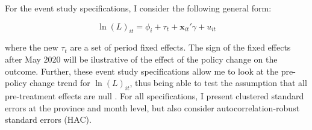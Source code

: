 \documentclass[11pt,a4paper]{article}\usepackage[]{graphicx}\usepackage[]{xcolor}
\begin{document}
For the event study specifications, I consider the following general form:

\begin{equation}
\label{eqn:event}
\ln(L)_{it} = \phi_i + \tau_t + \mathbf{x}_{it}'\gamma + u_{it}
\end{equation}

where the new $\tau_t$ are a set of period fixed effects. The sign of the fixed effects after May 2020 will be ilustrative of the effect of the policy change on the outcome. Further, these event study specifications allow me to look at the pre-policy change trend for $\ln(L)_{it}$, thus being able to test the assumption that all pre-treatment effects are null \parencite{HuntingtonKlein.2021}. For all specifications, I present clustered standard errors at the province and month level, but also consider autocorrelation-robust standard errors (HAC). 
\end{document}
